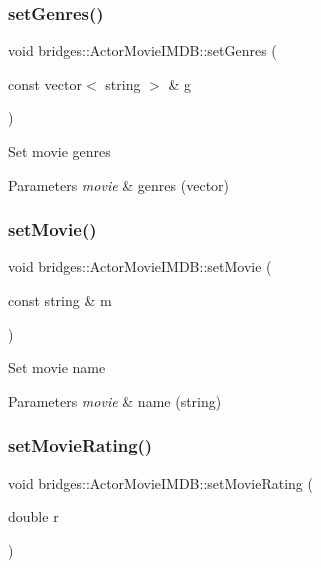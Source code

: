 \subsubsection{\texorpdfstring{set\+Genres()}{setGenres()}}
{\footnotesize\ttfamily void bridges\+::\+Actor\+Movie\+I\+M\+D\+B\+::set\+Genres (\begin{DoxyParamCaption}\item[{const vector$<$ string $>$ \&}]{g }\end{DoxyParamCaption})\hspace{0.3cm}{\ttfamily [inline]}}

Set movie genres


\begin{DoxyParams}{Parameters}
{\em movie} & genres (vector) \\
\hline
\end{DoxyParams}
\mbox{\label{classbridges_1_1_actor_movie_i_m_d_b_ae773ef3fc7ae370d4ab2bc1aeac60a9a}} 
\subsubsection{\texorpdfstring{set\+Movie()}{setMovie()}}
{\footnotesize\ttfamily void bridges\+::\+Actor\+Movie\+I\+M\+D\+B\+::set\+Movie (\begin{DoxyParamCaption}\item[{const string \&}]{m }\end{DoxyParamCaption})\hspace{0.3cm}{\ttfamily [inline]}}

Set movie name


\begin{DoxyParams}{Parameters}
{\em movie} & name (string) \\
\hline
\end{DoxyParams}
\mbox{\label{classbridges_1_1_actor_movie_i_m_d_b_aea16db5315526ff31a1685c08390cdc7}} 
\subsubsection{\texorpdfstring{set\+Movie\+Rating()}{setMovieRating()}}
{\footnotesize\ttfamily void bridges\+::\+Actor\+Movie\+I\+M\+D\+B\+::set\+Movie\+Rating (\begin{DoxyParamCaption}\item[{double}]{r }\end{DoxyParamCaption})\hspace{0.3cm}{\ttfamily [inline]}}

